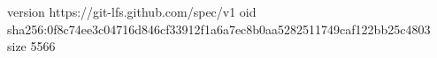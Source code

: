 version https://git-lfs.github.com/spec/v1
oid sha256:0f8c74ee3c04716d846cf33912f1a6a7ec8b0aa5282511749caf122bb25c4803
size 5566
